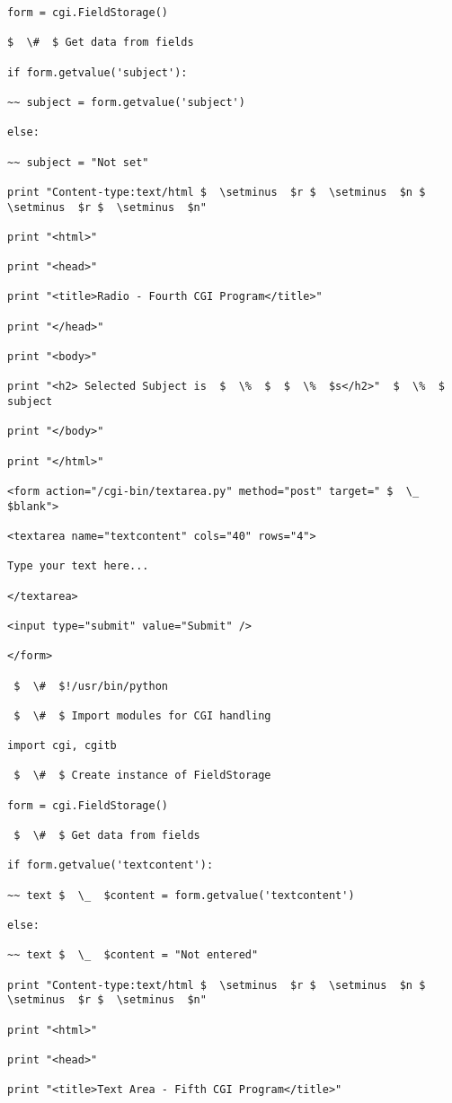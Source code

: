 \begin {enumerate}
\begin {enumerate}
\begin{verbatim}
form = cgi.FieldStorage()

$  \#  $ Get data from fields

if form.getvalue('subject'):

~~ subject = form.getvalue('subject')

else:

~~ subject = "Not set"

print "Content-type:text/html $  \setminus  $r $  \setminus  $n $  \setminus  $r $  \setminus  $n"

print "<html>"

print "<head>"

print "<title>Radio - Fourth CGI Program</title>"

print "</head>"

print "<body>"

print "<h2> Selected Subject is  $  \%  $  $  \%  $s</h2>"  $  \%  $ subject

print "</body>"

print "</html>"

<form action="/cgi-bin/textarea.py" method="post" target=" $  \_  $blank">

<textarea name="textcontent" cols="40" rows="4">

Type your text here...

</textarea>

<input type="submit" value="Submit" />

</form>

 $  \#  $!/usr/bin/python

 $  \#  $ Import modules for CGI handling

import cgi, cgitb

 $  \#  $ Create instance of FieldStorage

form = cgi.FieldStorage()

 $  \#  $ Get data from fields

if form.getvalue('textcontent'):

~~ text $  \_  $content = form.getvalue('textcontent')

else:

~~ text $  \_  $content = "Not entered"

print "Content-type:text/html $  \setminus  $r $  \setminus  $n $  \setminus  $r $  \setminus  $n"

print "<html>"

print "<head>"

print "<title>Text Area - Fifth CGI Program</title>"


\end{verbatim}
\end{enumerate}
\end{enumerate}
